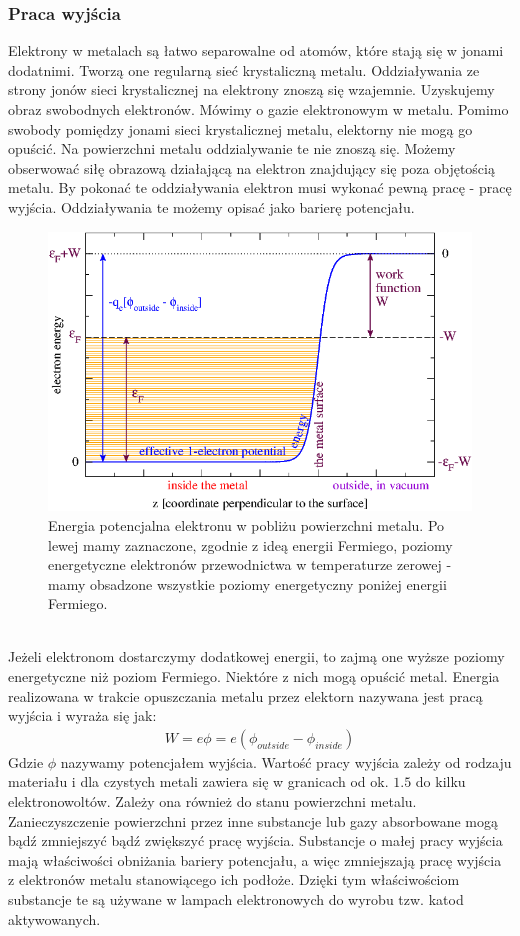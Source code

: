 \documentclass[paper=a4, fontsize=12pt]{scrartcl}
\begin{document}
\subsubsection{Praca wyjścia}
Elektrony w metalach są łatwo separowalne od atomów, które stają się w jonami dodatnimi. Tworzą one regularną sieć krystaliczną metalu. Oddziaływania ze strony jonów sieci krystalicznej na elektrony znoszą się wzajemnie. Uzyskujemy obraz swobodnych elektronów. Mówimy o gazie elektronowym w metalu. Pomimo swobody pomiędzy jonami sieci krystalicznej metalu, elektorny nie mogą go opuścić. Na powierzchni metalu oddzialywanie te nie znoszą się. Możemy obserwować siłę obrazową działającą na elektron znajdujący się poza objętością metalu. By pokonać te oddziaływania elektron musi wykonać pewną pracę - pracę wyjścia. Oddziaływania te możemy opisać jako barierę potencjału.
\begin{figure}[h!]
\centering
\includegraphics[width=0.7\linewidth]{FermiMetal}
\caption{Energia potencjalna elektronu w pobliżu powierzchni metalu. Po lewej mamy zaznaczone, zgodnie z ideą energii Fermiego, poziomy energetyczne elektronów przewodnictwa w temperaturze zerowej - mamy obsadzone wszystkie poziomy energetyczny poniżej energii Fermiego.}
\label{fig:FermiMetal}
\end{figure}\\
Jeżeli elektronom dostarczymy dodatkowej energii, to zajmą one wyższe poziomy energetyczne niż poziom Fermiego. Niektóre z nich mogą opuścić metal. Energia realizowana w trakcie opuszczania metalu przez elektorn nazywana jest pracą wyjścia i wyraża się jak:
\begin{align*}
W=e\phi=e(\phi_{outside}-\phi_{inside})
\end{align*}
Gdzie $\phi$ nazywamy potencjałem wyjścia. Wartość pracy wyjścia zależy od rodzaju materiału i dla czystych metali zawiera się w granicach od ok. $1.5$ do kilku elektronowoltów. Zależy ona również do stanu powierzchni metalu. Zanieczyszczenie powierzchni przez inne substancje lub gazy absorbowane mogą bądź zmniejszyć bądź zwiększyć pracę wyjścia. Substancje o małej pracy wyjścia mają właściwości obniżania bariery potencjału, a więc zmniejszają pracę wyjścia z elektronów metalu stanowiącego ich podłoże. Dzięki tym właściwościom substancje te są używane w lampach elektronowych do wyrobu tzw. katod aktywowanych.
\end{document}
